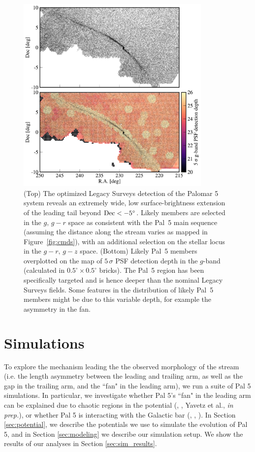 \documentclass[twocolumn]{aastex62}
\begin{document}
\begin{figure}
\begin{center}
\includegraphics[width=0.85\textwidth]{fig2_maps.pdf}
\end{center}
\caption{
(Top) The optimized Legacy Surveys detection of the Palomar 5 system reveals an extremely wide, low surface-brightness extension of the leading tail beyond $\rm Dec<-5^\circ$.
Likely members are selected in the $g,\,g-r$ space as consistent with the Pal~5 main sequence (assuming the distance along the stream varies as mapped in Figure~\ref{fig:cmds}), with an additional selection on the stellar locus in the $g-r,\,g-z$ space.
(Bottom) Likely Pal~5 members overplotted on the map of $5\,\sigma$ PSF detection depth in the $g$-band (calculated in $0.5^\circ\times0.5^\circ$ bricks).
The Pal~5 region has been specifically targeted and is hence deeper than the nominal Legacy Surveys fields.
Some features in the distribution of likely Pal~5 members might be due to this variable depth, for example the asymmetry in the fan.
}
\label{fig:maps}
\end{figure}



\section{Simulations}
\label{sec:sim}
To explore the mechanism leading the the observed morphology of the stream (i.e. the length asymmetry between the leading and trailing arm, as well as the gap in the trailing arm, and the ``fan" in the leading arm), we run a suite of Pal 5 simulations.
In particular, we investigate whether Pal 5's ``fan" in the leading arm can be explained due to chaotic regions in the potential (\citealt{Pearson:2015}, \citealt{Price-Whelan:2016}, Yavetz et al., {\it in prep.}), or whether Pal 5 is interacting with the Galactic bar (\citealt{Erkal:2017}, \citealt{Pearson:2017}, \citealt{Banik:2019}).
In Section \ref{sec:potential}, we describe the potentials we use to simulate the evolution of Pal 5, and in Section \ref{sec:modeling} we describe our simulation setup.
We show the results of our analyses in Section \ref{sec:sim_results}.
\end{document}
